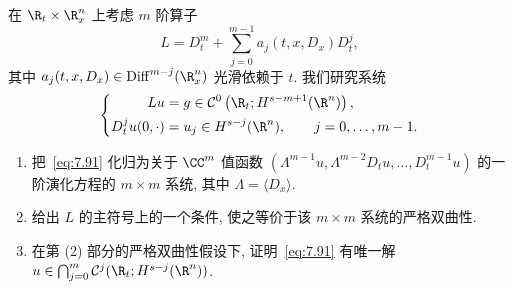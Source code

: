 \begin{exer}[高阶严格双曲方程]\label{ex:7.5}
在 $\R_t \times \R^n_x$ 上考虑 $m$ 阶算子
\begin{equation}\label{eq:7.90}
    L = D_t^m + \sum_{j=0}^{m-1} a_j(t, x, D_x) D_t^j,
\end{equation}
其中 $a_j(t, x, D_x) \in \operatorname{Diff}^{m-j}(\R^n_x)$ 光滑依赖于 $t$. 我们研究系统
\begin{equation}\label{eq:7.91}
    \left\{
    \begin{aligned}
        Lu &= g \in \mathcal{C}^0\left( \R_t; H^{s-m+1}(\R^n) \right), \\
        D_t^j u(0, \cdot) &= u_j \in H^{s-j}(\R^n), \qquad j = 0, \ldots, m-1.
    \end{aligned}
    \right.
\end{equation}
\begin{enumerate}
    \item 把~\eqref{eq:7.91} 化归为关于 $\CC^m$ 值函数 $(\Lambda^{m-1}u, \Lambda^{m-2}D_t u, \ldots, D_t^{m-1}u)$ 的一阶演化方程的 $m \times m$ 系统, 其中 $\Lambda = \langle D_x \rangle$.
    \item 给出 $L$ 的主符号上的一个条件, 使之等价于该 $m \times m$ 系统的严格双曲性.
    \item 在第 (2) 部分的严格双曲性假设下, 证明~\eqref{eq:7.91} 有唯一解 $u \in \bigcap_{j=0}^m \mathcal{C}^j(\R_t; H^{s-j}(\R^n))$.
\end{enumerate}
\end{exer}

